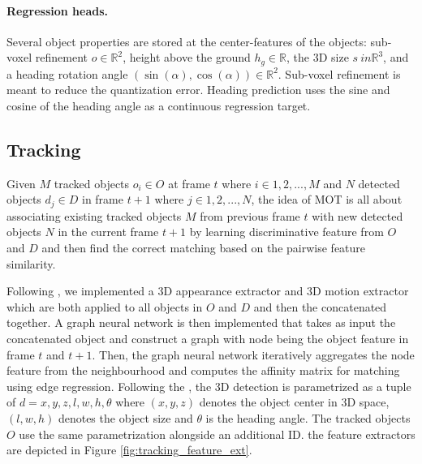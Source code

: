 \documentclass[10pt,twocolumn,letterpaper]{article}
\begin{document}
\paragraph{Regression heads.}
Several object properties are stored at the center-features of the objects: sub-voxel refinement $o \in \mathbb{R}^{2}$, height above the ground $h_{g} \in \mathbb{R}$, the 3D size $s \ in \mathbb{R}^{3}$, and a heading rotation angle $(\sin{(\alpha)}, \cos{(\alpha)}) \in \mathbb{R}^{2}$. Sub-voxel refinement is meant to reduce the quantization error. Heading prediction uses the sine and cosine of the heading angle as a continuous regression target.

\subsection{Tracking}
Given $M$ tracked objects $o_{i} \in O$ at frame $t$ where $i \in {1,2,..., M}$ and $N$ detected objects $d_{j} \in D$ in frame $t+1$ where $j \in {1,2,...,N}$, the idea of MOT is all about associating existing tracked objects $M$ from previous frame $t$ with new detected objects $N$ in the current frame $t+1$ by learning discriminative feature from $O$ and $D$ and then find the correct matching based on the pairwise feature similarity.

Following \cite{weng2020gnn3dmot}, we implemented a 3D appearance extractor and 3D motion extractor which are both applied to all objects in $O$ and $D$ and then the concatenated together. A graph neural network is then implemented that takes as input the concatenated object and construct a graph with node being the object feature in frame $t$ and $t+1$. Then, the graph neural network iteratively aggregates the node feature from the neighbourhood and computes the affinity matrix for matching using edge regression. Following the \cite{shi2019pointrcnn}, the 3D detection is parametrized as a tuple of $d = {x,y,z,l,w,h,\theta}$ where $(x,y,z)$ denotes the object center in 3D space, $(l,w,h)$ denotes the object size and $\theta$ is the heading angle. The tracked objects $O$ use the same parametrization alongside an additional ID. the feature extractors are depicted in Figure \ref{fig:tracking_feature_ext}.
\end{document}
